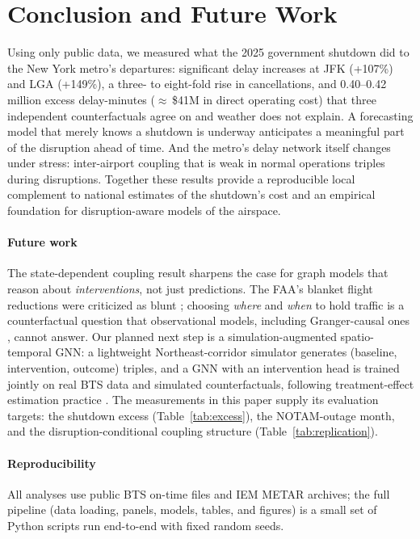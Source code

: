 \documentclass[10pt,journal]{IEEEtran}
\begin{document}
\section{Conclusion and Future Work}
\label{sec:conclusion}
Using only public data, we measured what the 2025 government shutdown did to
the New York metro's departures: significant delay increases at JFK (+107\%)
and LGA (+149\%), a three- to eight-fold rise in cancellations, and
0.40--0.42 million excess delay-minutes ($\approx$\,\$41M in direct operating
cost) that three independent counterfactuals agree on and weather does not
explain. A forecasting model that merely knows a shutdown is underway
anticipates a meaningful part of the disruption ahead of time. And the metro's
delay network itself changes under stress: inter-airport coupling that is weak
in normal operations triples during disruptions. Together these results provide
a reproducible local complement to national estimates of the shutdown's cost
and an empirical foundation for disruption-aware models of the airspace.

\paragraph{Future work}
The state-dependent coupling result sharpens the case for graph models that
reason about \emph{interventions}, not just predictions. The FAA's blanket
flight reductions were criticized as blunt \cite{ctp2026}; choosing \emph{where} and
\emph{when} to hold traffic is a counterfactual question that observational
models, including Granger-causal ones \cite{zhu2024}, cannot answer. Our
planned next step is a simulation-augmented spatio-temporal GNN: a lightweight
Northeast-corridor simulator generates (baseline, intervention, outcome)
triples, and a GNN with an intervention head is trained jointly on real BTS
data and simulated counterfactuals, following treatment-effect estimation
practice \cite{shi2019}. The measurements in this paper supply its evaluation
targets: the shutdown excess (Table~\ref{tab:excess}), the NOTAM-outage month,
and the disruption-conditional coupling structure (Table~\ref{tab:replication}).

\paragraph{Reproducibility}
All analyses use public BTS on-time files and IEM METAR archives; the full
pipeline (data loading, panels, models, tables, and figures) is a small set of
Python scripts run end-to-end with fixed random seeds.



\end{document}
